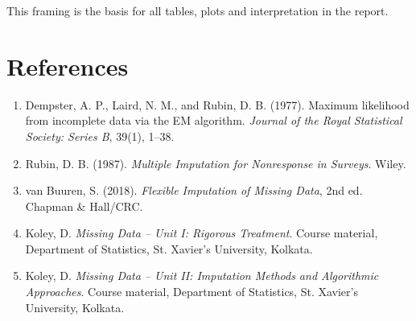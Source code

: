 \documentclass[11pt,a4paper]{article}
\begin{document}
This framing is the basis for all tables, plots and interpretation in the report.

\newpage
\section*{References}
\begin{enumerate}[leftmargin=*]
\item Dempster, A. P., Laird, N. M., and Rubin, D. B. (1977). Maximum likelihood from incomplete data via the EM algorithm. \textit{Journal of the Royal Statistical Society: Series B}, 39(1), 1--38.
\item Rubin, D. B. (1987). \textit{Multiple Imputation for Nonresponse in Surveys}. Wiley.
\item van Buuren, S. (2018). \textit{Flexible Imputation of Missing Data}, 2nd ed. Chapman \& Hall/CRC.
\item Koley, D. \textit{Missing Data -- Unit I: Rigorous Treatment}. Course material, Department of Statistics, St. Xavier's University, Kolkata.
\item Koley, D. \textit{Missing Data -- Unit II: Imputation Methods and Algorithmic Approaches}. Course material, Department of Statistics, St. Xavier's University, Kolkata.
\end{enumerate}
\end{document}
